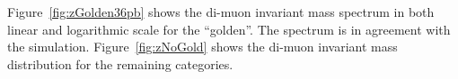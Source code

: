 Figure~\ref{fig:zGolden36pb} shows the di-muon invariant mass spectrum in both linear and
logarithmic scale for the \Zmm ``golden''. The spectrum is in agreement 
with the simulation.
Figure~\ref{fig:zNoGold} shows the di-muon invariant mass distribution for the remaining categories.
\begin{figure}[hbtp]
    \begin{minipage}{73mm}
      \begin{center}
      \end{center}
    \end{minipage}
    \begin{minipage}{73mm}
       \begin{center}

\end{center}
\end{minipage}
\end{figure}
